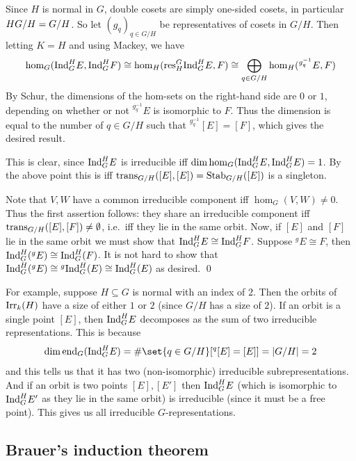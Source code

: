 \eprop

\bproof

    \benum
        \item Since $H$ is normal in $G$, double cosets are simply one-sided cosets, in particular $H\sl G/H=G/H$.
        So let $(g_q)_{q\in G/H}$ be representatives of cosets in $G/H$.
        Then letting $K=H$ and using Mackey, we have
        $$ \hom_G({\rm Ind}^H_GE,{\rm Ind}^H_GF) \cong \hom_H({\rm res}^G_H{\rm Ind}^H_GE,F) \cong \bigoplus_{q\in G/H}\hom_H({}^{g_q^{-1}}E,F) $$
        By Schur, the dimensions of the hom-sets on the right-hand side are $0$ or $1$, depending on whether or not ${}^{g_q^{-1}}E$ is isomorphic to $F$.
        Thus the dimension is equal to the number of $q\in G/H$ such that ${}^{g_q^{-1}}[E]=[F]$, which gives the desired result.

        \item This is clear, since ${\rm Ind}^H_GE$ is irreducible iff $\dim\hom_G({\rm Ind}^H_GE,{\rm Ind}^H_GE)=1$.
        By the above point this is iff ${\rm trans}_{G/H}([E],[E])={\rm Stab}_{G/H}([E])$ is a singleton.

        \item Note that $V,W$ have a common irreducible component iff $\hom_G(V,W)\neq0$.
        Thus the first assertion follows: they share an irreducible component iff ${\rm trans}_{G/H}([E],[F])\neq\emptyset$, i.e.\ iff they lie in the same orbit.
        Now, if $[E]$ and $[F]$ lie in the same orbit we must show that ${\rm Ind}^H_GE\cong{\rm Ind}^H_GF$.
        Suppose ${}^gE\cong F$, then ${\rm Ind}^H_G({}^gE)\cong{\rm Ind}^H_G(F)$.
        It is not hard to show that ${\rm Ind}^H_G({}^gE)\cong{}^g{\rm Ind}^H_G(E)\cong{\rm Ind}^H_G(E)$ as desired.
        \qed
    \eenum

\eproof

For example, suppose $H\subseteq G$ is normal with an index of $2$.
Then the orbits of ${\rm Irr}_k(H)$ have a size of either $1$ or $2$ (since $G/H$ has a size of $2$).
If an orbit is a single point $[E]$, then ${\rm Ind}^H_GE$ decomposes as the sum of two irreducible representations.
This is because
$$ \dim\endo_G(\Ind^H_GE) = \#\set{q\in G/H}[{{}^q[E]=[E]}] = \abs{G/H} = 2 $$
and this tells us that it has two (non-isomorphic) irreducible subrepresentations.
And if an orbit is two points $[E],[E']$ then ${\rm Ind}^H_GE$ (which is isomorphic to ${\rm Ind}^H_GE'$ as they lie in the same orbit) is irreducible (since it must be a free point).
This gives us all irreducible $G$-representations.

\subsection{Brauer's induction theorem}

